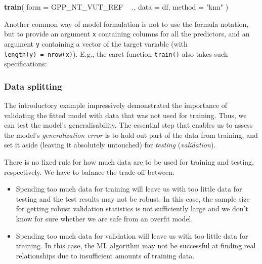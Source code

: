 \documentclass[
]{book}
\newenvironment{Shaded}{\begin{snugshade}}{\end{snugshade}}
\newcommand{\DataTypeTok}[1]{\textcolor[rgb]{0.13,0.29,0.53}{#1}}
\newcommand{\KeywordTok}[1]{\textcolor[rgb]{0.13,0.29,0.53}{\textbf{#1}}}
\newcommand{\NormalTok}[1]{#1}
\newcommand{\OperatorTok}[1]{\textcolor[rgb]{0.81,0.36,0.00}{\textbf{#1}}}
\newcommand{\StringTok}[1]{\textcolor[rgb]{0.31,0.60,0.02}{#1}}
\providecommand{\tightlist}{%
  \setlength{\itemsep}{0pt}\setlength{\parskip}{0pt}}
\begin{document}
\begin{Shaded}
\begin{Highlighting}[]
\KeywordTok{train}\NormalTok{(}
  \DataTypeTok{form =}\NormalTok{ GPP_NT_VUT_REF }\OperatorTok{~}\StringTok{ }\NormalTok{., }
  \DataTypeTok{data =}\NormalTok{ df, }
  \DataTypeTok{method =} \StringTok{"knn"}
\NormalTok{)}
\end{Highlighting}
\end{Shaded}

Another common way of model formulation is not to use the formula notation, but to provide an argument \texttt{x} containing columns for all the predictors, and an argument \texttt{y} containing a vector of the target variable (with \texttt{length(y)\ =\ nrow(x)}). E.g., the caret function \texttt{train()} also takes such specifications:

\begin{Shaded}
\end{Shaded}

\hypertarget{data-splitting}{%
\subsubsection{Data splitting}\label{data-splitting}}

The introductory example impressively demonstrated the importance of validating the fitted model with data that was not used for training. Thus, we can test the model's generalisability. The essential step that enables us to assess the model's \emph{generalization error} is to hold out part of the data from training, and set it aside (leaving it absolutely untouched) for \emph{testing} (\emph{validation}).

There is no fixed rule for how much data are to be used for training and testing, respectively. We have to balance the trade-off between:

\begin{itemize}
\tightlist
\item
  Spending too much data for training will leave us with too little data for testing and the test results may not be robust. In this case, the sample size for getting robust validation statistics is not sufficiently large and we don't know for sure whether we are safe from an overfit model.
\item
  Spending too much data for validation will leave us with too little data for training. In this case, the ML algorithm may not be successful at finding real relationships due to insufficient amounts of training data.
\end{itemize}
\end{document}
